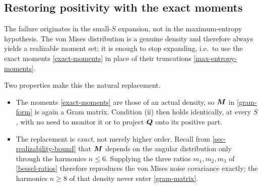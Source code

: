 \documentclass[a5paper]{article}
\begin{document}
\subsection{Restoring positivity with the exact moments}
\label{sec-exact-closure}

The failure originates in the small-$S$ expansion, not in the maximum-entropy hypothesis. The von Mises distribution is a genuine density and therefore always yields a realizable moment set; it is enough to stop expanding, i.e.\ to use the exact moments \eqref{exact-moments} in place of their truncations \eqref{max-entropy-moments}.

Two properties make this the natural replacement.
\begin{itemize}
    \item The moments \eqref{exact-moments} are those of an actual density, so $\boldsymbol M$ in \eqref{gram-form} is again a Gram matrix. Condition (ii) then holds identically, at every $S$, with no need to monitor it or to project $\boldsymbol Q$ onto its positive part.
    \item The replacement is \emph{exact}, not merely higher order. Recall from \cref{sec-realizability-bound} that $\boldsymbol M$ depends on the angular distribution only through the harmonics $n \le 6$. Supplying the three ratios $m_1, m_2, m_3$ of \eqref{bessel-ratios} therefore reproduces the von Mises noise covariance exactly; the harmonics $n \ge 8$ of that density never enter \eqref{gram-matrix}.
\end{itemize}
\end{document}

